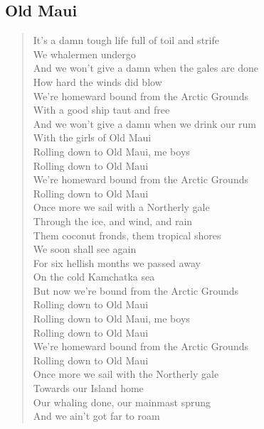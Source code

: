 \documentclass[11pt]{article}
\begin{document}
\subsection{Old Maui}
\label{sec:org708fe2c}
\begin{verse}
It's a damn tough life full of toil and strife\\
We whalermen undergo\\
And we won't give a damn when the gales are done\\
How hard the winds did blow\\
We're homeward bound from the Arctic Grounds\\
With a good ship taut and free\\
And we won't give a damn when we drink our rum\\
With the girls of Old Maui\\
\vspace*{1em}
Rolling down to Old Maui, me boys\\
Rolling down to Old Maui\\
We're homeward bound from the Arctic Grounds\\
Rolling down to Old Maui\\
\vspace*{1em}
Once more we sail with a Northerly gale\\
Through the ice, and wind, and rain\\
Them coconut fronds, them tropical shores\\
We soon shall see again\\
For six hellish months we passed away\\
On the cold Kamchatka sea\\
But now we're bound from the Arctic Grounds\\
Rolling down to Old Maui\\
\vspace*{1em}
Rolling down to Old Maui, me boys\\
Rolling down to Old Maui\\
We're homeward bound from the Arctic Grounds\\
Rolling down to Old Maui\\
\vspace*{1em}
Once more we sail with the Northerly gale\\
Towards our Island home\\
Our whaling done, our mainmast sprung\\
And we ain't got far to roam\\

\end{verse}
\end{document}
